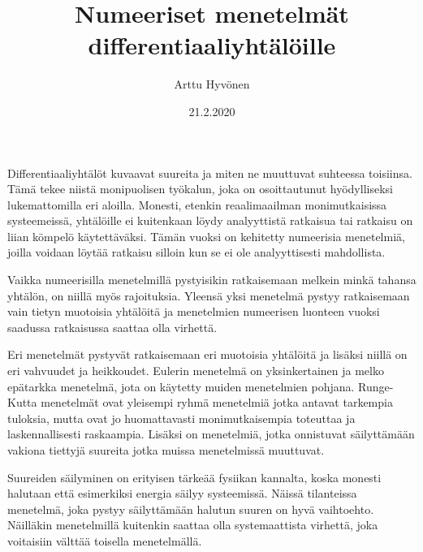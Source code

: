 \documentclass[12pt, finnish]{article}
\title{Numeeriset menetelmät differentiaaliyhtälöille} %
\author{Arttu Hyv\"onen} %
\date{21.2.2020}
\begin{document}
\maketitle %


Differentiaaliyhtälöt kuvaavat suureita ja miten ne muuttuvat suhteessa toisiinsa. Tämä tekee niistä monipuolisen työkalun, joka on osoittautunut hyödylliseksi lukemattomilla eri aloilla. Monesti, etenkin reaalimaailman monimutkaisissa systeemeissä, yhtälöille ei kuitenkaan löydy analyyttistä ratkaisua tai ratkaisu on liian kömpelö käytettäväksi. Tämän vuoksi on kehitetty numeerisia menetelmiä, joilla voidaan löytää ratkaisu silloin kun se ei ole analyyttisesti mahdollista.

Vaikka numeerisilla menetelmillä pystyisikin ratkaisemaan melkein minkä tahansa yhtälön, on niillä myös rajoituksia. Yleensä yksi menetelmä pystyy ratkaisemaan vain tietyn muotoisia yhtälöitä ja menetelmien numeerisen luonteen vuoksi saadussa ratkaisussa saattaa olla virhettä. 

Eri menetelmät pystyvät ratkaisemaan eri muotoisia yhtälöitä ja lisäksi niillä on eri vahvuudet ja heikkoudet. Eulerin menetelmä on yksinkertainen ja melko epätarkka menetelmä, jota on käytetty muiden menetelmien pohjana. Runge-Kutta menetelmät ovat yleisempi ryhmä menetelmiä jotka antavat tarkempia tuloksia, mutta ovat jo huomattavasti monimutkaisempia toteuttaa ja laskennallisesti raskaampia. Lisäksi on menetelmiä, jotka onnistuvat säilyttämään vakiona tiettyjä suureita jotka muissa menetelmissä muuttuvat. 

Suureiden säilyminen on erityisen tärkeää fysiikan kannalta, koska monesti halutaan että esimerkiksi energia säilyy systeemissä. Näissä tilanteissa menetelmä, joka pystyy säilyttämään halutun suuren on hyvä vaihtoehto. Näilläkin menetelmillä kuitenkin saattaa olla systemaattista virhettä, joka voitaisiin välttää toisella menetelmällä.


\thispagestyle{empty}
\end{document}
